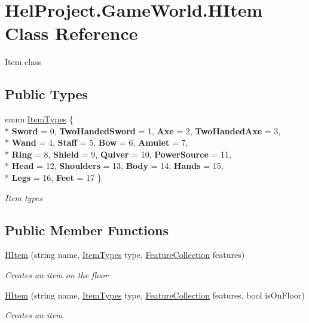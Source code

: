 \hypertarget{class_hel_project_1_1_game_world_1_1_h_item}{}\section{Hel\+Project.\+Game\+World.\+H\+Item Class Reference}
\label{class_hel_project_1_1_game_world_1_1_h_item}


Item class  


\subsection*{Public Types}
\begin{DoxyCompactItemize}
\item 
enum \hyperlink{class_hel_project_1_1_game_world_1_1_h_item_a7440e7b22ff0e62bcaf89a513716357b}{Item\+Types} \{ \\*
{\bfseries Sword} = 0, 
{\bfseries Two\+Handed\+Sword} = 1, 
{\bfseries Axe} = 2, 
{\bfseries Two\+Handed\+Axe} = 3, 
\\*
{\bfseries Wand} = 4, 
{\bfseries Staff} = 5, 
{\bfseries Bow} = 6, 
{\bfseries Amulet} = 7, 
\\*
{\bfseries Ring} = 8, 
{\bfseries Shield} = 9, 
{\bfseries Quiver} = 10, 
{\bfseries Power\+Source} = 11, 
\\*
{\bfseries Head} = 12, 
{\bfseries Shoulders} = 13, 
{\bfseries Body} = 14, 
{\bfseries Hands} = 15, 
\\*
{\bfseries Legs} = 16, 
{\bfseries Feet} = 17
 \}
\begin{DoxyCompactList}\small\item\em Item types \end{DoxyCompactList}\end{DoxyCompactItemize}
\subsection*{Public Member Functions}
\begin{DoxyCompactItemize}
\item 
\hyperlink{class_hel_project_1_1_game_world_1_1_h_item_a85c06624c5da360525a7b109c28c3f7e}{H\+Item} (string name, \hyperlink{class_hel_project_1_1_game_world_1_1_h_item_a7440e7b22ff0e62bcaf89a513716357b}{Item\+Types} type, \hyperlink{class_hel_project_1_1_features_1_1_feature_collection}{Feature\+Collection} features)
\begin{DoxyCompactList}\small\item\em Creates an item on the floor \end{DoxyCompactList}\item 
\hyperlink{class_hel_project_1_1_game_world_1_1_h_item_a917513f7394553cfc1069ea042004a2a}{H\+Item} (string name, \hyperlink{class_hel_project_1_1_game_world_1_1_h_item_a7440e7b22ff0e62bcaf89a513716357b}{Item\+Types} type, \hyperlink{class_hel_project_1_1_features_1_1_feature_collection}{Feature\+Collection} features, bool is\+On\+Floor)
\begin{DoxyCompactList}\small\item\em Creates an item \end{DoxyCompactList}\end{DoxyCompactItemize}
